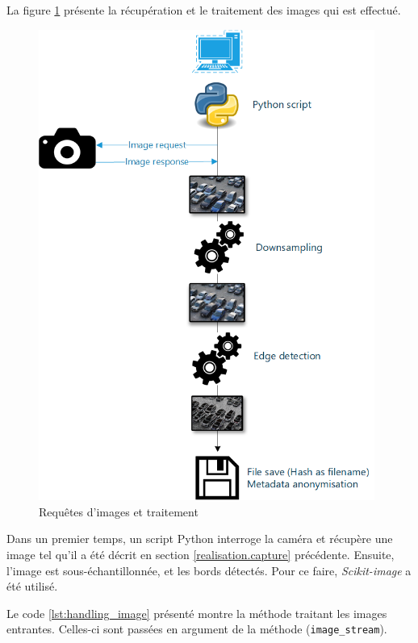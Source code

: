 La figure \ref{fig:image_process} présente la récupération et le traitement des images qui est effectué.

\begin{figure}[H]
    \includegraphics[width=110mm]{img/realisation/image_process.png}
    \centering
    \caption{Requêtes d'images et traitement}
    \label{fig:image_process}
\end{figure} 

Dans un premier temps, un script Python interroge la caméra et récupère une image tel qu'il a été décrit en section \ref{realisation.capture} précédente. Ensuite, l'image est sous-échantillonnée, et les bords détectés. Pour ce faire, \textit{Scikit-image} a été utilisé.

Le code \ref{lst:handling_image} présenté montre la méthode traitant les images entrantes. Celles-ci sont passées en argument de la méthode (\lstinline[columns=fixed]{image_stream}).


